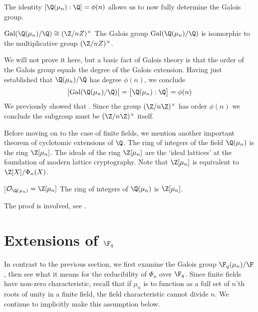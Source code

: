 The identity $[\Q(\mu_n):\Q]=\phi(n)$ allows us to now fully determine the Galois group.
\begin{corollary}{$\Gal(\Q(\mu_n)/\Q)\cong(\Z/nZ)^\times$}
    The Galois group $\Gal(\Q(\mu_n)/\Q)$ is isomorphic to the multiplicative group $(\Z/nZ)^\times$.

    \proof
    We will not prove it here, but a basic fact of Galois theory is that the order of the Galois group equals the degree of the Galois extension.
    Having just established that $\Q(\mu_n)/\Q$ has degree $\phi(n)$, we conclude
    \begin{equation}
        \big|\Gal(\Q(\mu_n)/\Q)\big| = \big[\Q(\mu_n) : \Q\big] = \phi(n)
    \end{equation}
    We previously showed that .
    Since the group $(\Z/n\Z)^\times$ has order $\phi(n)$ we conclude the subgroup must be $(\Z/n\Z)^\times$ itself.
\end{corollary}

Before moving on to the case of finite fields, we mention another important theorem of cyclotomic extensions of $\Q$.
The ring of integers of the field $\Q(\mu_n)$ is the ring $\Z[\mu_n]$.
The ideals of the ring $\Z[\mu_n]$ are the `ideal lattices' at the foundation of modern lattice cryptography.
Note that $\Z[\mu_n]$ is equivalent to $\Z[X]/\Phi_n(X)$.

\begin{theorem}[O_{Q(mu_n)} = Z[mu_n]]{$\mathcal{O}_{\Q(\mu_n)}=\Z[\mu_n]$}
    The ring of integers of $\Q(\mu_n)$ is $\Z[\mu_n]$.

    \proof
    The proof is involved, see \cite{Nguyen}.
\end{theorem}


\section[Extensions of F_q]{Extensions of $\F_q$}

In contrast to the previous section, we first examine the Galois group $\F_q(\mu_n)/\F$, then see what it means for the reducibility of $\Phi_n$ over $\F_q$.
Since finite fields have non-zero characteristic, recall that if $\mu_n$ is to function as a full set of $n$'th roots of unity in a finite field, the field characteristic cannot divide $n$.
We continue to implicitly make this assumption below.

